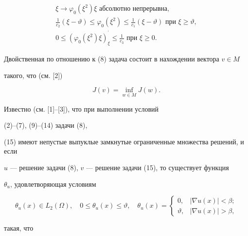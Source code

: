 \begin{gather}


\xi \to \varphi_{0}(\xi^{2})\xi \text{ абсолютно непрерывна,}\\


\frac{1}{c_2}(\xi -\vartheta ) \le \varphi_{0}(\xi^{2}) \le 


\frac{1}{c_1}(\xi - \vartheta )


\text{ при } \xi \ge \vartheta, \\


0 \le (\varphi_{0}(\xi^{2})\xi )^{^\prime }_{\xi } \le 


\frac{1}{c_3} \text{ при } \xi \ge 0. 


\end{gather}


 


Двойственная по отношению к (8) задача состоит в нахождении вектора $v \in M$


такого, что (см. [2])


\begin{equation}


J(v) = \inf_{w \in M} J(w).


\end{equation}


Известно (см. [1]--[3]), что при выполнении условий


(2)--(7), (9)--(14) задачи (8),


(15) имеют непустые выпуклые замкнутые ограниченные множества решений, и если


$u$ --- решение задачи (8), $v$ --- решение задачи (15), то существует функция


$\theta_{u}$, удовлетворяющая условиям


$$


\theta_{u}(x) \in L_{2}(\Omega ),\quad 0 \le \theta_{u}(x) \le \vartheta , 


\quad 


\theta_{u}(x) =


\begin{cases}


0, & |\nabla u(x)| < \beta; \\


\vartheta, & |\nabla u(x)| > \beta, 


\end{cases}


$$


такая, что


$$



